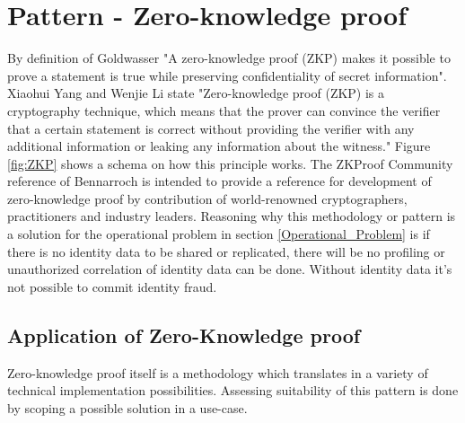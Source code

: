 \section{Pattern - Zero-knowledge proof}
By definition of Goldwasser \etal \cite{Goldwasser} "A zero-knowledge proof (ZKP) makes it possible to prove a statement is true while preserving confidentiality of secret information". 
Xiaohui Yang and Wenjie Li \cite{YANG2020102050} state "Zero-knowledge proof (ZKP) is a cryptography technique,
which means that the prover can convince the verifier that a certain statement is correct without providing the verifier with any additional information or leaking any information about the witness." Figure \ref{fig:ZKP} shows a schema on how this principle works. The ZKProof Community reference \cite{2019:zkproof:community-reference-0.2} of Bennarroch \etal is intended to provide a reference for development of zero-knowledge proof by contribution of world-renowned cryptographers, practitioners and industry leaders.
Reasoning why this methodology or pattern is a solution for the operational problem in section \ref{Operational_Problem} is if there is no identity data to be shared or replicated, there will be no profiling or unauthorized correlation of identity data can be done. Without identity data it's not possible to commit identity fraud.

\subsection{Application of Zero-Knowledge proof}
Zero-knowledge proof itself is a methodology which translates in a variety of technical implementation possibilities. Assessing suitability of this pattern is done by scoping a possible solution in a use-case.


